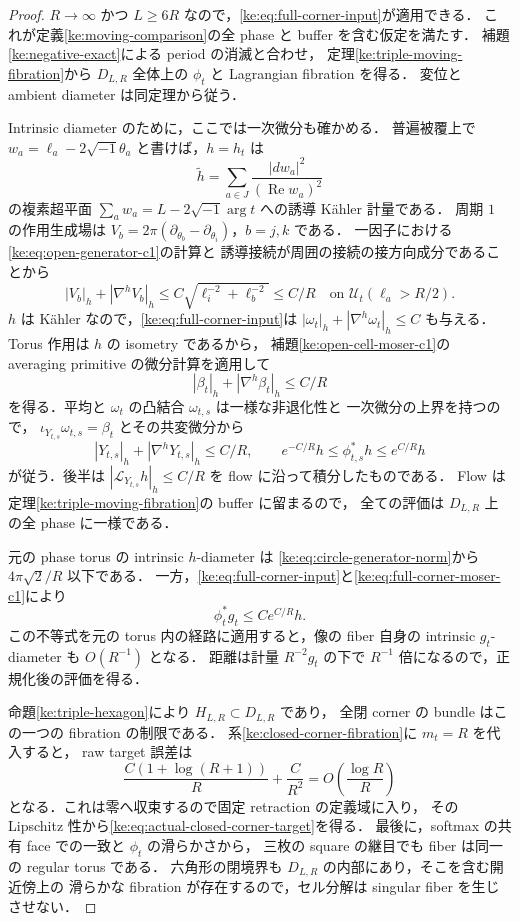 \begin{proof}
$R\to\infty$ かつ $L\ge6R$ なので，\eqref{ke:eq:full-corner-input}が適用できる．
これが定義\ref{ke:moving-comparison}の全 phase と buffer を含む仮定を満たす．
補題\ref{ke:negative-exact}による period の消滅と合わせ，
定理\ref{ke:triple-moving-fibration}から $D_{L,R}$ 全体上の
$\phi_t$ と Lagrangian fibration を得る．
変位と ambient diameter は同定理から従う．

Intrinsic diameter のために，ここでは一次微分も確かめる．
普遍被覆上で $w_a=\ell_a-2\sqrt{-1}\theta_a$ と書けば，$h=h_t$ は
\[
 \widetilde h=\sum_{a\in J}\frac{|dw_a|^2}{(\operatorname{Re}w_a)^2}
\]
の複素超平面 $\sum_a w_a=L-2\sqrt{-1}\arg t$ への誘導 K\"ahler 計量である．
周期 $1$ の作用生成場は
$V_b=2\pi(\partial_{\theta_b}-\partial_{\theta_i})$，$b=j,k$ である．
一因子における\eqref{ke:eq:open-generator-c1}の計算と
誘導接続が周囲の接続の接方向成分であることから
\begin{equation}\label{ke:eq:full-corner-generator-c1}
 |V_b|_h+|\nabla^hV_b|_h
 \le C\sqrt{\ell_i^{-2}+\ell_b^{-2}}
 \le C/R
 \quad\text{on }\mathcal U_t(\ell_a>R/2).
\end{equation}
$h$ は K\"ahler なので，\eqref{ke:eq:full-corner-input}は
$|\omega_t|_h+|\nabla^h\omega_t|_h\le C$ も与える．
Torus 作用は $h$ の isometry であるから，
補題\ref{ke:open-cell-moser-c1}の averaging primitive の微分計算を適用して
\[
 |\beta_t|_h+|\nabla^h\beta_t|_h\le C/R
\]
を得る．平均と $\omega_t$ の凸結合 $\omega_{t,s}$ は一様な非退化性と
一次微分の上界を持つので，
$\iota_{Y_{t,s}}\omega_{t,s}=\beta_t$ とその共変微分から
\begin{equation}\label{ke:eq:full-corner-moser-c1}
 |Y_{t,s}|_h+|\nabla^hY_{t,s}|_h\le C/R,
 \qquad e^{-C/R}h\le\phi_{t,s}^*h\le e^{C/R}h
\end{equation}
が従う．後半は $|\mathcal L_{Y_{t,s}}h|_h\le C/R$ を flow に沿って積分したものである．
Flow は定理\ref{ke:triple-moving-fibration}の buffer に留まるので，
全ての評価は $D_{L,R}$ 上の全 phase に一様である．

元の phase torus の intrinsic $h$-diameter は
\eqref{ke:eq:circle-generator-norm}から $4\pi\sqrt2/R$ 以下である．
一方，\eqref{ke:eq:full-corner-input}と\eqref{ke:eq:full-corner-moser-c1}により
\[
 \phi_t^*g_t\le Ce^{C/R}h.
\]
この不等式を元の torus 内の経路に適用すると，像の fiber 自身の
intrinsic $g_t$-diameter も $O(R^{-1})$ となる．
距離は計量 $R^{-2}g_t$ の下で $R^{-1}$ 倍になるので，正規化後の評価を得る．

命題\ref{ke:triple-hexagon}により $H_{L,R}\subset D_{L,R}$ であり，
全閉 corner の bundle はこの一つの fibration の制限である．
系\ref{ke:closed-corner-fibration}に $m_t=R$ を代入すると，
raw target 誤差は
\[
 \frac{C(1+\log(R+1))}{R}+\frac{C}{R^2}
 =O\!\left(\frac{\log R}{R}\right)
\]
となる．これは零へ収束するので固定 retraction の定義域に入り，
その Lipschitz 性から\eqref{ke:eq:actual-closed-corner-target}を得る．
最後に，softmax の共有 face での一致と $\phi_t$ の滑らかさから，
三枚の square の継目でも fiber は同一の regular torus である．
六角形の閉境界も $D_{L,R}$ の内部にあり，そこを含む開近傍上の
滑らかな fibration が存在するので，セル分解は singular fiber を生じさせない．
\end{proof}


